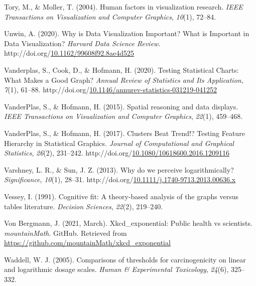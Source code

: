 \documentclass[print]{nuthesis}
\newlength{\cslhangindent}
\newenvironment{CSLReferences}[2]%
{\setlength{\parindent}{0pt}%
\everypar{\setlength{\hangindent}{\cslhangindent}}\ignorespaces}%
{\par}
\begin{document}
\begin{CSLReferences}{1}{0}
\leavevmode{}%
Tory, M., \& Moller, T. (2004). Human factors in visualization research. \emph{IEEE Transactions on Visualization and Computer Graphics}, \emph{10}(1), 72--84.

\leavevmode{}%
Unwin, A. (2020). Why is {Data} {Visualization} {Important}? {What} is {Important} in {Data} {Visualization}? \emph{Harvard Data Science Review}. http://doi.org/\href{https://doi.org/10.1162/99608f92.8ae4d525}{10.1162/99608f92.8ae4d525}

\leavevmode{}%
Vanderplas, S., Cook, D., \& Hofmann, H. (2020). Testing {Statistical} {Charts}: {What} {Makes} a {Good} {Graph}? \emph{Annual Review of Statistics and Its Application}, \emph{7}(1), 61--88. http://doi.org/\href{https://doi.org/10.1146/annurev-statistics-031219-041252}{10.1146/annurev-statistics-031219-041252}

\leavevmode{}%
VanderPlas, S., \& Hofmann, H. (2015). Spatial reasoning and data displays. \emph{IEEE Transactions on Visualization and Computer Graphics}, \emph{22}(1), 459--468.

\leavevmode{}%
VanderPlas, S., \& Hofmann, H. (2017). Clusters {Beat} {Trend}!? {Testing} {Feature} {Hierarchy} in {Statistical} {Graphics}. \emph{Journal of Computational and Graphical Statistics}, \emph{26}(2), 231--242. http://doi.org/\href{https://doi.org/10.1080/10618600.2016.1209116}{10.1080/10618600.2016.1209116}

\leavevmode{}%
Varshney, L. R., \& Sun, J. Z. (2013). Why do we perceive logarithmically? \emph{Significance}, \emph{10}(1), 28--31. http://doi.org/\href{https://doi.org/10.1111/j.1740-9713.2013.00636.x}{10.1111/j.1740-9713.2013.00636.x}

\leavevmode{}%
Vessey, I. (1991). Cognitive fit: A theory-based analysis of the graphs versus tables literature. \emph{Decision Sciences}, \emph{22}(2), 219--240.

\leavevmode{}%
Von Bergmann, J. (2021, March). Xkcd\_exponential: Public health vs scientists. \emph{mountainMath}. GitHub. Retrieved from \url{https://github.com/mountainMath/xkcd_exponential}

\leavevmode{}%
Waddell, W. J. (2005). Comparisons of thresholds for carcinogenicity on linear and logarithmic dosage scales. \emph{Human \& Experimental Toxicology}, \emph{24}(6), 325--332.


\end{CSLReferences}
\end{document}
